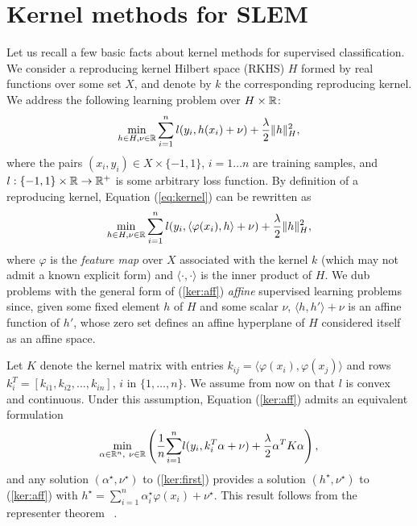\section{Kernel methods for SLEM}
\label{nonlinear SLEM}

Let us recall a few basic facts about kernel methods for supervised
classification. We consider a reproducing kernel Hilbert space (RKHS)
$H$ formed by real functions over some set
$X$, and denote by $k$ the corresponding reproducing kernel.  We
address the following learning problem over $H\times\mathbb R$:
\begin{equation}
\min_{h\in H,\nu\in\mathbb R}
\sum_{i=1}^n l(y_i,h(x_i)+\nu) + \frac{\lambda}{2}\|h\|_H^2,
\label{eq:kernel}
\end{equation}  
where the pairs $(x_i,y_i)\in X\times \{-1,1\}$, $i=1\dots n$ are training samples, and $l: \{-1,1\}\times \mathbb R\rightarrow\mathbb R^+$ is some arbitrary loss function. 
By definition of a reproducing kernel,
Equation (\ref{eq:kernel}) can be rewritten as
\begin{equation}
\min_{h\in H,\nu\in\mathbb R}
\sum_{i=1}^n l(y_i,\langle \varphi(x_i),h\rangle+\nu) +
\dfrac{\lambda}{2}\|h\|_H^2,
\label{ker:aff}
\end{equation} 
where $\varphi$ is the {\em feature map} over $X$ associated with the
kernel $k$ (which may not admit a known explicit form) and $\langle \cdot, \cdot \rangle$ is the inner product of $H$. We dub problems with the general form of (\ref{ker:aff}) {\em affine}
supervised learning problems since, given some fixed element $h$ of
$H$ and some scalar $\nu$, $\langle h,h'\rangle+\nu$ is an affine function of $h'$,
whose zero set defines an affine hyperplane of $H$ considered itself
as an affine space.

Let $K$ denote the kernel matrix with entries $k_{ij}=\langle\varphi(x_i),
\varphi(x_j)\rangle$ and rows $k_i^T=[k_{i1}, k_{i2},...,k_{in}]$, $i$ in $\{1,\ldots,n\}$.  We assume from now on that $l$ is convex and continuous. Under this assumption, Equation (\ref{ker:aff}) admits an equivalent formulation
\begin{align}
\min_{\alpha\in\mathbb R^{n}, \ \nu\in\mathbb R} \left(\dfrac{1}{n}\displaystyle{\sum_{i=1}^n} l(y_i, k_i^T\alpha+\nu)  +\dfrac{\lambda}{2}\alpha^TK\alpha\right), \label{ker:first}
\end{align}
and any solution $(\alpha^\star,\nu^\star)$ to (\ref{ker:first})
provides
a solution $(h^\star,\nu^\star)$ to (\ref{ker:aff}) with
$h^\star=\sum_{i=1}^n \alpha_i^\star\varphi(x_i)+\nu^\star$. This result follows from the representer theorem
~\cite{SHS01,Wahba90}.


